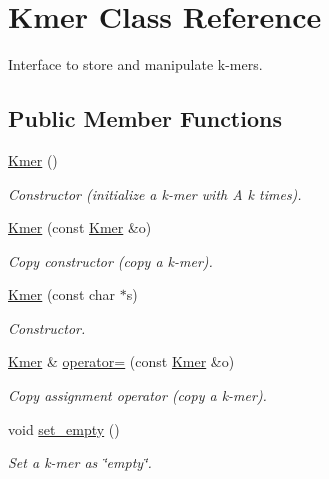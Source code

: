 \hypertarget{classKmer}{}\section{Kmer Class Reference}
\label{classKmer}


Interface to store and manipulate k-\/mers.  


\subsection*{Public Member Functions}
\begin{DoxyCompactItemize}
\item 
\mbox{\label{classKmer_a5ab9d401261a8bd25968b7be5554bf45}} 
\hyperlink{classKmer_a5ab9d401261a8bd25968b7be5554bf45}{Kmer} ()
\begin{DoxyCompactList}\small\item\em Constructor (initialize a k-\/mer with \textquotesingle{}A\textquotesingle{} k times). \end{DoxyCompactList}\item 
\hyperlink{classKmer_a8b6222680b4b2c7ba854f59bdbddc5b6}{Kmer} (const \hyperlink{classKmer}{Kmer} \&o)
\begin{DoxyCompactList}\small\item\em Copy constructor (copy a k-\/mer). \end{DoxyCompactList}\item 
\hyperlink{classKmer_a1fb825d0a9444de791c5bba652d69f1d}{Kmer} (const char $\ast$s)
\begin{DoxyCompactList}\small\item\em Constructor. \end{DoxyCompactList}\item 
\hyperlink{classKmer}{Kmer} \& \hyperlink{classKmer_a56dc01450914c70b999ff95893a1df2c}{operator=} (const \hyperlink{classKmer}{Kmer} \&o)
\begin{DoxyCompactList}\small\item\em Copy assignment operator (copy a k-\/mer). \end{DoxyCompactList}\item 
\mbox{\label{classKmer_a13f76eacb925e986280191035788bc03}} 
void \hyperlink{classKmer_a13f76eacb925e986280191035788bc03}{set\+\_\+empty} ()
\begin{DoxyCompactList}\small\item\em Set a k-\/mer as \char`\"{}empty\char`\"{}. \end{DoxyCompactList}\item 

\end{DoxyCompactItemize}
